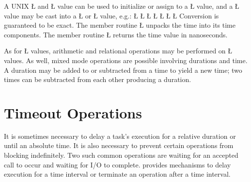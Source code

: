 \documentclass[openright,twoside]{report}
\begin{document}
A UNIX \LGinlinetrue\LGbegin\lgrinde\L{}\endlgrinde\LGend{} and \LGinlinetrue\LGbegin\lgrinde\L{}\endlgrinde\LGend{} value can be used to initialize or assign to a \LGinlinetrue\LGbegin\lgrinde\L{}\endlgrinde\LGend{} value, and a \LGinlinetrue\LGbegin\lgrinde\L{}\endlgrinde\LGend{} value may be cast into a \LGinlinetrue\LGbegin\lgrinde\L{}\endlgrinde\LGend{} or \LGinlinetrue\LGbegin\lgrinde\L{}\endlgrinde\LGend{} value, e.g.:
\LGinlinefalse\LGbegin\lgrinde
\L{}
\L{}
\CE{}\L{}
\CE{}\L{}
\CE{}\L{}
\CE{}\L{}
\CE{}\L{}
\CE{}\endlgrinde\LGend
Conversion is guaranteed to be exact.
The member routine \LGinlinetrue\LGbegin\lgrinde\L{}\endlgrinde\LGend{} unpacks the time into its time components.
The member routine \LGinlinetrue\LGbegin\lgrinde\L{}\endlgrinde\LGend{} returns the time value in nanoseconds.

As for \LGinlinetrue\LGbegin\lgrinde\L{}\endlgrinde\LGend{} values, arithmetic and relational operations may be performed on \LGinlinetrue\LGbegin\lgrinde\L{}\endlgrinde\LGend{} values.
As well, mixed mode operations are possible involving durations and time.
A duration may be added to or subtracted from a time to yield a new time;
two times can be subtracted from each other producing a duration.


\section{Timeout Operations}

It is sometimes necessary to delay a task's execution for a relative duration or until an absolute time.
It is also necessary to prevent certain operations from blocking indefinitely.
Two such common operations are waiting for an accepted call to occur and waiting for I/O to complete.
\uC provides mechanisms to delay execution for a time interval or terminate an operation after a time interval.
\end{document}
